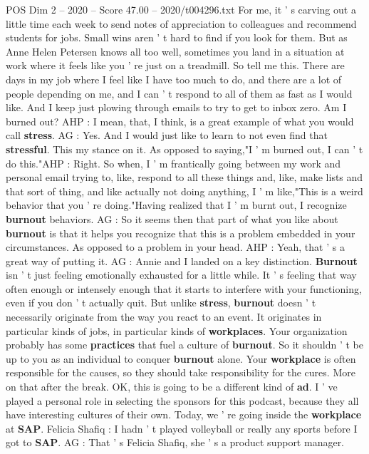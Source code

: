 \begin{textsample}{POS Dim 2 – 2020 – Score 47.00 – 2020/t004296.txt}
For me, it ' s carving out a little time each week to send notes of appreciation to colleagues and recommend students for jobs.
Small wins aren ' t hard to find if you look for them.
But as Anne Helen Petersen knows all too well, sometimes you land in a situation at work where it feels like you ' re just on a treadmill.
So tell me this.
There are days in my job where I feel like I have too much to do, and there are a lot of people depending on me, and I can ' t respond to all of them as fast as I would like.
And I keep just plowing through emails to try to get to inbox zero.
Am I burned out?
AHP : I mean, that, I think, is a great example of what you would call \textbf{stress}.
AG : Yes.
And I would just like to learn to not even find that \textbf{stressful}.
This my stance on it.
As opposed to saying,"I ' m burned out, I can ' t do this."AHP : Right.
So when, I ' m frantically going between my work and personal email trying to, like, respond to all these things and, like, make lists and that sort of thing, and like actually not doing anything, I ' m like,"This is a weird behavior that you ' re doing."Having realized that I ' m burnt out, I recognize \textbf{burnout} behaviors.
AG : So it seems then that part of what you like about \textbf{burnout} is that it helps you recognize that this is a problem embedded in your circumstances.
As opposed to a problem in your head.
AHP : Yeah, that ' s a great way of putting it.
AG : Annie and I landed on a key distinction. \textbf{Burnout} isn ' t just feeling emotionally exhausted for a little while.
It ' s feeling that way often enough or intensely enough that it starts to interfere with your functioning, even if you don ' t actually quit.
But unlike \textbf{stress}, \textbf{burnout} doesn ' t necessarily originate from the way you react to an event.
It originates in particular kinds of jobs, in particular kinds of \textbf{workplaces}.
Your organization probably has some \textbf{practices} that fuel a culture of \textbf{burnout}.
So it shouldn ' t be up to you as an individual to conquer \textbf{burnout} alone.
Your \textbf{workplace} is often responsible for the causes, so they should take responsibility for the cures.
More on that after the break.
OK, this is going to be a different kind of \textbf{ad}.
I ' ve played a personal role in selecting the sponsors for this podcast, because they all have interesting cultures of their own.
Today, we ' re going inside the \textbf{workplace} at \textbf{SAP}.
Felicia Shafiq : I hadn ' t played volleyball or really any sports before I got to \textbf{SAP}.
AG : That ' s Felicia Shafiq, she ' s a product support manager.

\end{textsample}
